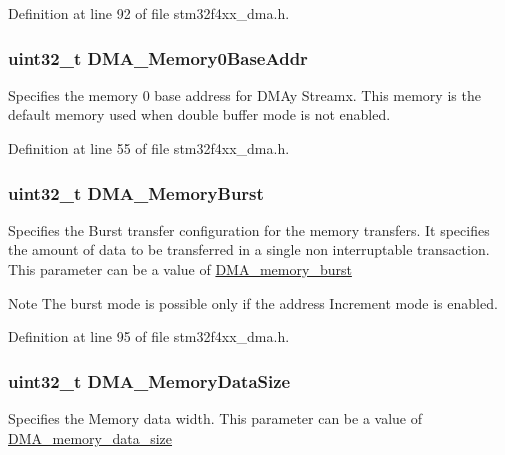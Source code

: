 Definition at line 92 of file stm32f4xx\-\_\-dma.\-h.

\hypertarget{struct_d_m_a___init_type_def_aebf1267410908265f83a8037245c337e}{
\subsubsection[{D\-M\-A\-\_\-\-Memory0\-Base\-Addr}]{\setlength{\rightskip}{0pt plus 5cm}uint32\-\_\-t D\-M\-A\-\_\-\-Memory0\-Base\-Addr}}\label{struct_d_m_a___init_type_def_aebf1267410908265f83a8037245c337e}
Specifies the memory 0 base address for D\-M\-Ay Streamx. This memory is the default memory used when double buffer mode is not enabled. 

Definition at line 55 of file stm32f4xx\-\_\-dma.\-h.

\hypertarget{struct_d_m_a___init_type_def_a90987eb939726acf365f2bf039a51725}{
\subsubsection[{D\-M\-A\-\_\-\-Memory\-Burst}]{\setlength{\rightskip}{0pt plus 5cm}uint32\-\_\-t D\-M\-A\-\_\-\-Memory\-Burst}}\label{struct_d_m_a___init_type_def_a90987eb939726acf365f2bf039a51725}
Specifies the Burst transfer configuration for the memory transfers. It specifies the amount of data to be transferred in a single non interruptable transaction. This parameter can be a value of \hyperlink{group___d_m_a__memory__burst}{D\-M\-A\-\_\-memory\-\_\-burst} \begin{DoxyNote}{Note}
The burst mode is possible only if the address Increment mode is enabled. 
\end{DoxyNote}


Definition at line 95 of file stm32f4xx\-\_\-dma.\-h.

\hypertarget{struct_d_m_a___init_type_def_a7ec1648d136d31d6c504565bf6949eb6}{
\subsubsection[{D\-M\-A\-\_\-\-Memory\-Data\-Size}]{\setlength{\rightskip}{0pt plus 5cm}uint32\-\_\-t D\-M\-A\-\_\-\-Memory\-Data\-Size}}\label{struct_d_m_a___init_type_def_a7ec1648d136d31d6c504565bf6949eb6}
Specifies the Memory data width. This parameter can be a value of \hyperlink{group___d_m_a__memory__data__size}{D\-M\-A\-\_\-memory\-\_\-data\-\_\-size} 

